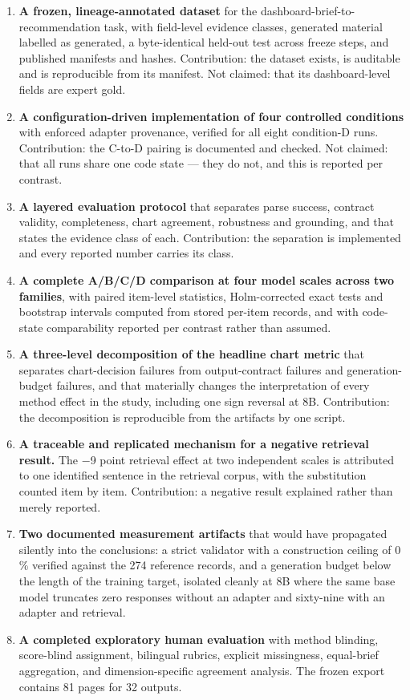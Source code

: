 \begin{enumerate}
\def\labelenumi{\arabic{enumi}.}
\item
  \textbf{A frozen, lineage-annotated dataset} for the dashboard-brief-to-recommendation task, with field-level evidence classes, generated material labelled as generated, a byte-identical held-out test across freeze steps, and published manifests and hashes. Contribution: the dataset exists, is auditable and is reproducible from its manifest. Not claimed: that its dashboard-level fields are expert gold.
\item
  \textbf{A configuration-driven implementation of four controlled conditions} with enforced adapter provenance, verified for all eight condition-D runs. Contribution: the C-to-D pairing is documented and checked. Not claimed: that all runs share one code state --- they do not, and this is reported per contrast.
\item
  \textbf{A layered evaluation protocol} that separates parse success, contract validity, completeness, chart agreement, robustness and grounding, and that states the evidence class of each. Contribution: the separation is implemented and every reported number carries its class.
\item
  \textbf{A complete A/B/C/D comparison at four model scales across two families}, with paired item-level statistics, Holm-corrected exact tests and bootstrap intervals computed from stored per-item records, and with code-state comparability reported per contrast rather than assumed.
\item
  \textbf{A three-level decomposition of the headline chart metric} that separates chart-decision failures from output-contract failures and generation-budget failures, and that materially changes the interpretation of every method effect in the study, including one sign reversal at 8B. Contribution: the decomposition is reproducible from the artifacts by one script.
\item
  \textbf{A traceable and replicated mechanism for a negative retrieval result.} The \ensuremath{-}9 point retrieval effect at two independent scales is attributed to one identified sentence in the retrieval corpus, with the substitution counted item by item. Contribution: a negative result explained rather than merely reported.
\item
  \textbf{Two documented measurement artifacts} that would have propagated silently into the conclusions: a strict validator with a construction ceiling of 0 \% verified against the 274 reference records, and a generation budget below the length of the training target, isolated cleanly at 8B where the same base model truncates zero responses without an adapter and sixty-nine with an adapter and retrieval.
\item
  \textbf{A completed exploratory human evaluation} with method blinding, score-blind assignment, bilingual rubrics, explicit missingness, equal-brief aggregation, and dimension-specific agreement analysis. The frozen export contains 81 pages for 32 outputs.
\end{enumerate}

